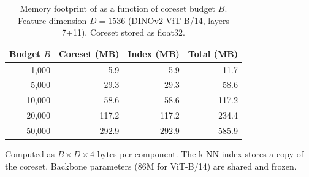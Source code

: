 \begin{table}[H]
\centering
\caption{Memory footprint of \method{} as a function of coreset budget $B$. Feature dimension $D=1536$ (DINOv2 ViT-B/14, layers 7+11). Coreset stored as float32.}
\label{tab:memory_footprint}
\begin{tabular}{rrrr}
\toprule
Budget $B$ & Coreset (MB) & Index (MB) & Total (MB) \\
\midrule
1{,}000   &  5.9  &  5.9  &  11.7 \\
5{,}000   & 29.3  & 29.3  &  58.6 \\
10{,}000  & 58.6  & 58.6  & 117.2 \\
20{,}000  & 117.2 & 117.2 & 234.4 \\
50{,}000  & 292.9 & 292.9 & 585.9 \\
\bottomrule
\end{tabular}
\vspace{1mm}
\footnotesize{Computed as $B \times D \times 4$ bytes per component. The k-NN index stores a copy of the coreset. Backbone parameters (86M for ViT-B/14) are shared and frozen.}
\end{table}
